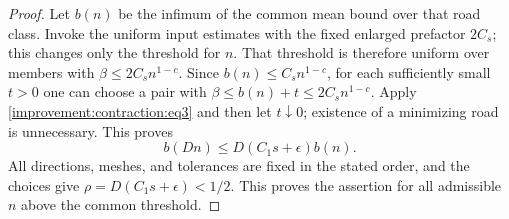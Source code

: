 \begin{proof}
Let $b(n)$ be the infimum of the common mean bound over that road
class. Invoke the uniform input estimates with the fixed enlarged
prefactor $2C_s$; this changes only the threshold for $n$. That
threshold is therefore uniform over members with
$\beta\leq2C_s n^{1-c}$. Since $b(n)\leq C_s n^{1-c}$, for each
sufficiently small $t>0$ one can choose a pair with
$\beta\leq b(n)+t\leq2C_s n^{1-c}$. Apply
\eqref{improvement:contraction:eq3} and then let $t\downarrow0$; existence
of a minimizing road is unnecessary. This proves
\begin{equation}
 b(Dn)\leq D(C_1s+\epsilon)b(n).
 \label{improvement:contraction:eq4}
\end{equation}
All directions, meshes, and tolerances are fixed in the stated order,
and the choices give $\rho=D(C_1s+\epsilon)<1/2$. This proves the
assertion for all admissible $n$ above the common threshold.
\end{proof}

